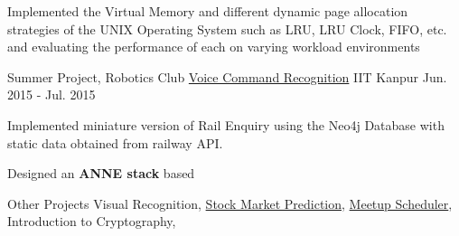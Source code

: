 \begin{cventries}
{\begin{cvitems}
        \item {Implemented the Virtual Memory and different dynamic page allocation strategies of the UNIX Operating System such as LRU, LRU Clock, FIFO, etc. and evaluating the performance of each on varying workload environments}
      \end{cvitems}
    }
  \cventry
    {Summer Project, Robotics Club}
    {\href{https://bitbucket.org/arhamchopra11/voicecommandrecognition}{Voice Command Recognition}}
    {IIT Kanpur}
    {Jun. 2015 - Jul. 2015}
    {
      \begin{cvitems}
        \item {Implemented miniature version of Rail Enquiry using the Neo4j Database with static data obtained from railway API.}
        \item {Designed an \textbf{ANNE stack} based }
      \end{cvitems}
    }
  \cventry
    {Other Projects}
    {}
    {}
    {}
    {
      Visual Recognition, 
      \href{https://bitbucket.org/arhamchopra11/stockprediction}{Stock Market Prediction}, 
      \href{https://bitbucket.org/arhamchopra11/meetupscheduler}{Meetup Scheduler}, 
      Introduction to Cryptography, 
    }
\end{cventries}
